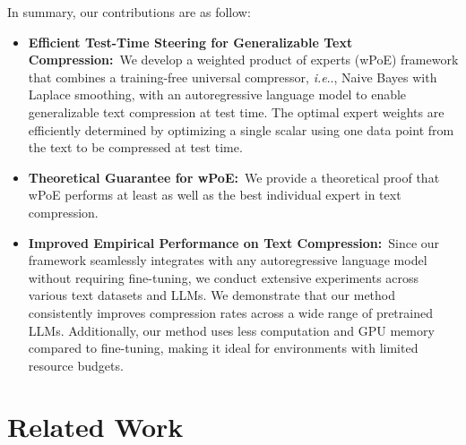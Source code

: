 \documentclass[11pt]{article}
\makeatletter
\DeclareRobustCommand\onedot{\futurelet\@let@token\@onedot}
\def\@onedot{\ifx\@let@token.\else.\null\fi\xspace}
\def\ie{\emph{i.e}\onedot} \def\Ie{\emph{I.e}\onedot}
\makeatother
\begin{document}
In summary, our contributions are as follow:
\begin{itemize}
    \item \textbf{Efficient Test-Time Steering for Generalizable Text Compression:}\
    We develop a weighted product of experts (wPoE) framework that combines a training-free universal compressor, \ie, Naive Bayes with Laplace smoothing, with an autoregressive language model to enable generalizable text compression at test time. 
    The optimal expert weights are efficiently determined by optimizing a single scalar using one data point from the text to be compressed at test time.
    \item \textbf{Theoretical Guarantee for wPoE:}\
    We provide a theoretical proof that wPoE performs at least as well as the best individual expert in text compression.
    \item \textbf{Improved Empirical Performance on Text Compression:}\
    Since our framework seamlessly integrates with any autoregressive language model without requiring fine-tuning, we conduct extensive experiments across various text datasets and LLMs. 
    We demonstrate that our method consistently improves compression rates across a wide range of pretrained LLMs.
    Additionally, our method uses less computation and GPU memory compared to fine-tuning, making it ideal for environments with limited resource budgets.
\end{itemize}
\section{Related Work}
\end{document}
